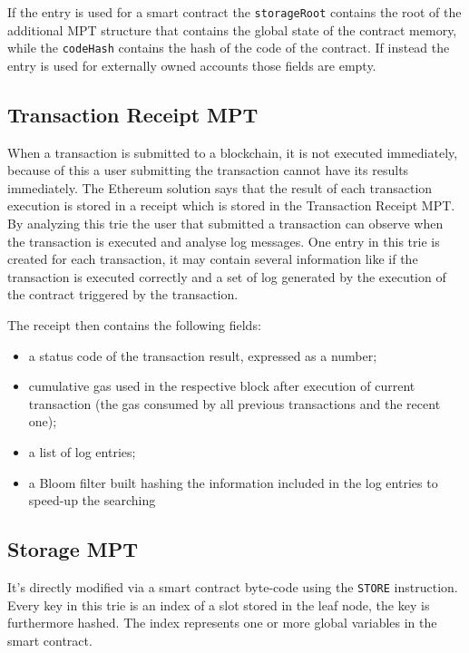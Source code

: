 If the entry is used for a smart contract the \verb|storageRoot| contains the root of the additional MPT structure that contains the global state of the contract memory, while the \verb|codeHash| contains the hash of the code of the contract.
If instead the entry is used for externally owned accounts those fields are empty.

\subsection{Transaction Receipt MPT}
When a transaction is submitted to a blockchain, it is not executed immediately, because of this a user submitting the transaction cannot have its results immediately.
The Ethereum solution says that the result of each transaction execution is stored in a receipt which is stored in the Transaction Receipt MPT.
By analyzing this trie the user that submitted a transaction can observe when the transaction is executed and analyse log messages.
One entry in this trie is created for each transaction, it may contain several information like if the transaction is executed correctly and a set of log generated by the execution of the contract triggered by the transaction.

The receipt then contains the following fields:
\begin{itemize}
    \item a status code of the transaction result, expressed as a number;
    \item cumulative gas used in the respective block after execution of current transaction (the gas consumed by all previous transactions and the recent one);
    \item a list of log entries;
    \item a Bloom filter built hashing the information included in the log entries to speed-up the searching
\end{itemize}

\subsection{Storage MPT}
It's directly modified via a smart contract byte-code using the \verb|STORE| instruction.
Every key in this trie is an index of a slot stored in the leaf node, the key is furthermore hashed.
The index represents one or more global variables in the smart contract.





